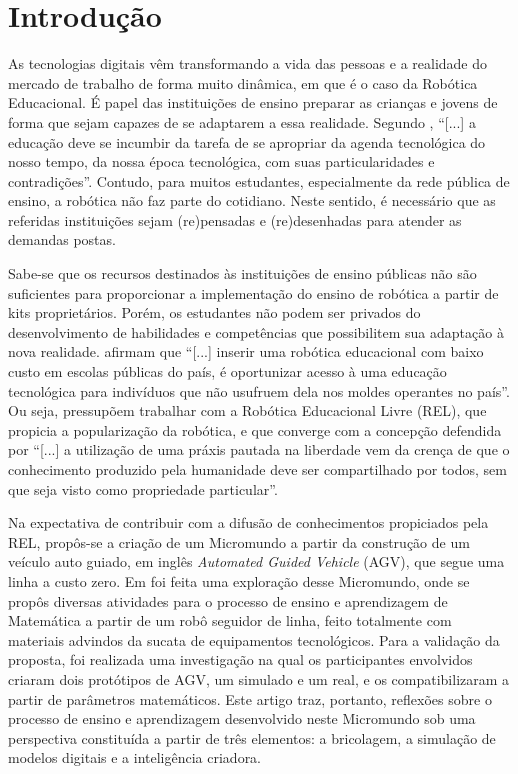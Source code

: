 \documentclass[portuguese]{textolivre}
\begin{document}
\section{Introdução}\label{sec-intro}
As tecnologias digitais vêm transformando a vida das pessoas e a realidade do mercado de trabalho de forma muito dinâmica, em que é o caso da Robótica Educacional. É papel das instituições de ensino preparar as crianças e jovens de forma que sejam capazes de se adaptarem a essa realidade. Segundo \textcite[p. 27]{SantosPaulo2019}, “[...] a educação deve se incumbir da tarefa de se apropriar da agenda tecnológica do nosso tempo, da nossa época tecnológica, com suas particularidades e contradições”. Contudo, para muitos estudantes, especialmente da rede pública de ensino, a robótica não faz parte do cotidiano. Neste sentido, é necessário que as referidas instituições sejam (re)pensadas e (re)desenhadas para atender as demandas postas.

Sabe-se que os recursos destinados às instituições de ensino públicas não são suficientes para proporcionar a implementação do ensino de robótica a partir de kits proprietários. Porém, os estudantes não podem ser privados do desenvolvimento de habilidades e competências que possibilitem sua adaptação à nova realidade. \textcite[p. 2]{Guimaraes2020} afirmam que “[...] inserir uma robótica educacional com baixo custo em escolas públicas do país, é oportunizar acesso à uma educação tecnológica para indivíduos que não usufruem dela nos moldes operantes no país”. Ou seja, pressupõem trabalhar com a Robótica Educacional Livre (REL), que propicia a popularização da robótica, e que converge com a concepção defendida por \textcite[p. 4]{CesarDanilo2009} “[...] a utilização de uma práxis pautada na liberdade vem da crença de que o conhecimento produzido pela humanidade deve ser compartilhado por todos, sem que seja visto como propriedade particular”.

Na expectativa de contribuir com a difusão de conhecimentos propiciados pela REL, propôs-se a criação de um Micromundo a partir da construção de um veículo auto guiado, em inglês \emph{Automated Guided Vehicle} (AGV), que segue uma linha a custo zero. Em \textcite{Guimaraes2020} foi feita uma exploração desse Micromundo, onde se propôs diversas atividades para o processo de ensino e aprendizagem de Matemática a partir de um robô seguidor de linha, feito totalmente com materiais advindos da sucata de equipamentos tecnológicos. Para a validação da proposta, foi realizada uma investigação na qual os participantes envolvidos criaram dois protótipos de AGV, um simulado e um real, e os compatibilizaram a partir de parâmetros matemáticos. Este artigo traz, portanto, reflexões sobre o processo de ensino e aprendizagem desenvolvido neste Micromundo sob uma perspectiva constituída a partir de três elementos: a bricolagem, a simulação de modelos digitais e a inteligência criadora.
\end{document}
